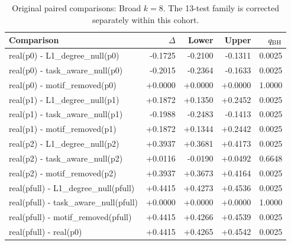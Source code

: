 \begin{table}[H]\centering
\caption{Original paired comparisons: Broad $k=8$. The 13-test family is corrected separately within this cohort.}\small
\begin{tabular}{lrrrr}\toprule
Comparison & $\Delta$ & Lower & Upper & $q_{\rm BH}$ \\ \midrule
real(p0) - L1\_degree\_null(p0) & -0.1725 & -0.2100 & -0.1311 & 0.0025 \\
real(p0) - task\_aware\_null(p0) & -0.2015 & -0.2364 & -0.1633 & 0.0025 \\
real(p0) - motif\_removed(p0) & +0.0000 & +0.0000 & +0.0000 & 1.0000 \\
real(p1) - L1\_degree\_null(p1) & +0.1872 & +0.1350 & +0.2452 & 0.0025 \\
real(p1) - task\_aware\_null(p1) & -0.1988 & -0.2483 & -0.1413 & 0.0025 \\
real(p1) - motif\_removed(p1) & +0.1872 & +0.1344 & +0.2442 & 0.0025 \\
real(p2) - L1\_degree\_null(p2) & +0.3937 & +0.3681 & +0.4173 & 0.0025 \\
real(p2) - task\_aware\_null(p2) & +0.0116 & -0.0190 & +0.0492 & 0.6648 \\
real(p2) - motif\_removed(p2) & +0.3937 & +0.3673 & +0.4164 & 0.0025 \\
real(pfull) - L1\_degree\_null(pfull) & +0.4415 & +0.4273 & +0.4536 & 0.0025 \\
real(pfull) - task\_aware\_null(pfull) & +0.0000 & +0.0000 & +0.0000 & 1.0000 \\
real(pfull) - motif\_removed(pfull) & +0.4415 & +0.4266 & +0.4539 & 0.0025 \\
real(pfull) - real(p0) & +0.4415 & +0.4265 & +0.4542 & 0.0025 \\
\bottomrule\end{tabular}\end{table}
